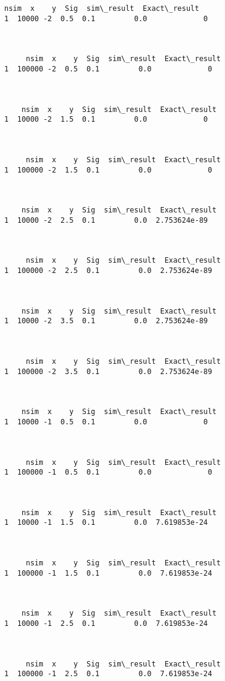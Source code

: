 \documentclass[12pt]{article}
\begin{document}
    \begin{Verbatim}[commandchars=\\\{\}]
    nsim  x    y  Sig  sim\_result  Exact\_result
1  10000 -2  0.5  0.1         0.0             0



     nsim  x    y  Sig  sim\_result  Exact\_result
1  100000 -2  0.5  0.1         0.0             0



    nsim  x    y  Sig  sim\_result  Exact\_result
1  10000 -2  1.5  0.1         0.0             0



     nsim  x    y  Sig  sim\_result  Exact\_result
1  100000 -2  1.5  0.1         0.0             0



    nsim  x    y  Sig  sim\_result  Exact\_result
1  10000 -2  2.5  0.1         0.0  2.753624e-89



     nsim  x    y  Sig  sim\_result  Exact\_result
1  100000 -2  2.5  0.1         0.0  2.753624e-89



    nsim  x    y  Sig  sim\_result  Exact\_result
1  10000 -2  3.5  0.1         0.0  2.753624e-89



     nsim  x    y  Sig  sim\_result  Exact\_result
1  100000 -2  3.5  0.1         0.0  2.753624e-89



    nsim  x    y  Sig  sim\_result  Exact\_result
1  10000 -1  0.5  0.1         0.0             0



     nsim  x    y  Sig  sim\_result  Exact\_result
1  100000 -1  0.5  0.1         0.0             0



    nsim  x    y  Sig  sim\_result  Exact\_result
1  10000 -1  1.5  0.1         0.0  7.619853e-24



     nsim  x    y  Sig  sim\_result  Exact\_result
1  100000 -1  1.5  0.1         0.0  7.619853e-24



    nsim  x    y  Sig  sim\_result  Exact\_result
1  10000 -1  2.5  0.1         0.0  7.619853e-24



     nsim  x    y  Sig  sim\_result  Exact\_result
1  100000 -1  2.5  0.1         0.0  7.619853e-24




\end{Verbatim}
\end{document}
